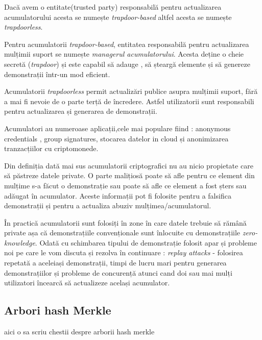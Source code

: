 \documentclass[12pt, letterpaper]{article}
\begin{document}
Dacă avem o entitate(trusted party) responsabilă pentru actualizarea acumulatorului acesta se numește \emph{trapdoor-based} altfel acesta se numește \emph{trapdoorless}.

Pentru acumulatorii \emph{trapdoor-based}, entitatea responsabilă pentru actualizarea mulțimii suport se numește \emph{managerul acumulatorului}. Acesta deține o cheie secretă (\emph{trapdoor}) și este capabil să adauge , să șteargă elemente și să genereze demonstrații într-un mod eficient.

Acumulatorii \emph{trapdoorless} permit actualizări publice asupra mulțimii suport, fără a mai fi nevoie de o parte terță de încredere. Astfel utilizatorii sunt responsabili pentru actualizarea și generarea de demonstrații.


Acumulatori au numeroase aplicații,cele mai populare fiind : anonymous credentials , group signatures, stocarea datelor in cloud și anonimizarea tranzacțiilor cu criptomonede.
\cite{cryptoeprint:2023/1001}

Din definiția dată mai sus acumulatorii criptografici nu au nicio propietate care să păstreze datele private. O parte malițiosă poate să afle pentru ce element din mulțime s-a făcut o demonstrație sau poate să afle ce element a fost șters sau adăugat în acumulator. Aceste informații pot fi folosite pentru a falsifica demonstrații și pentru a actualiza abuziv mulțimea/acumulatorul.

În practică acumulatorii sunt folosiți în zone în care datele trebuie să rămână private așa că demonstrațiile convenționale sunt înlocuite cu demonstrațiile \emph{zero-knowledge}. Odată cu schimbarea tipului de demonstrație folosit apar și probleme noi pe care le vom discuta și rezolva în continuare : \emph{replay attacks} - folosirea repetată a aceleiași demonstrații, timpi de lucru mari pentru generarea demonstrațiilor și probleme de concurență atunci cand doi sau mai mulți utilizatori încearcă să actualizeze același acumulator.

\subsection{Arbori hash Merkle}

aici o sa scriu chestii despre arborii hash merkle



\printbibliography
\end{document}
